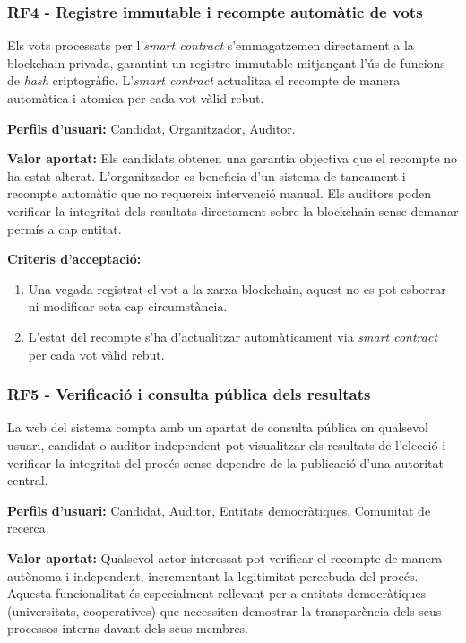 \documentclass[12pt,a4paper,catalan]{article}
\begin{document}
\subsubsection*{RF4 - Registre immutable i recompte automàtic de vots}

Els vots processats per l'\textit{smart contract} s'emmagatzemen directament a la blockchain privada, garantint un registre immutable mitjançant l'ús de funcions de \textit{hash} criptogràfic. L'\textit{smart contract} actualitza el recompte de manera automàtica i atomica per cada vot vàlid rebut.

\textbf{Perfils d'usuari:} Candidat, Organitzador, Auditor.

\textbf{Valor aportat:} Els candidats obtenen una garantia objectiva que el recompte no ha estat alterat. L'organitzador es beneficia d'un sistema de tancament i recompte automàtic que no requereix intervenció manual. Els auditors poden verificar la integritat dels resultats directament sobre la blockchain sense demanar permís a cap entitat.

\textbf{Criteris d'acceptació:}
\begin{enumerate}[label=\roman*.]
    \item Una vegada registrat el vot a la xarxa blockchain, aquest no es pot esborrar ni modificar sota cap circumstància.
    \item L'estat del recompte s'ha d'actualitzar automàticament via \textit{smart contract} per cada vot vàlid rebut.
\end{enumerate}

\subsubsection*{RF5 - Verificació i consulta pública dels resultats}

La web del sistema compta amb un apartat de consulta pública on qualsevol usuari, candidat o auditor independent pot visualitzar els resultats de l'elecció i verificar la integritat del procés sense dependre de la publicació d'una autoritat central.

\textbf{Perfils d'usuari:} Candidat, Auditor, Entitats democràtiques, Comunitat de recerca.

\textbf{Valor aportat:} Qualsevol actor interessat pot verificar el recompte de manera autònoma i independent, incrementant la legitimitat percebuda del procés. Aquesta funcionalitat és especialment rellevant per a entitats democràtiques (universitats, cooperatives) que necessiten demostrar la transparència dels seus processos interns davant dels seus membres.
\end{document}
